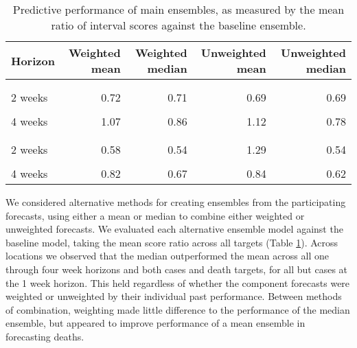 \documentclass[
]{article}
\begin{document}
\begin{table}

\caption{\label{tab:ensembles}Predictive performance of main ensembles, as measured by the mean ratio of interval scores against the baseline ensemble.}
\centering
\begin{tabular}[t]{lrrrr}
\toprule
Horizon & Weighted mean & Weighted median & Unweighted mean & Unweighted median\\
\midrule
\addlinespace[0.3em]
\multicolumn{5}{l}{\textbf{Cases}}\\
\hspace{1em}\cellcolor{gray!6}{1 week} & \cellcolor{gray!6}{0.63} & \cellcolor{gray!6}{0.64} & \cellcolor{gray!6}{0.61} & \cellcolor{gray!6}{0.64}\\
\hspace{1em}2 weeks & 0.72 & 0.71 & 0.69 & 0.69\\
\hspace{1em}\cellcolor{gray!6}{3 weeks} & \cellcolor{gray!6}{0.82} & \cellcolor{gray!6}{0.76} & \cellcolor{gray!6}{0.82} & \cellcolor{gray!6}{0.72}\\
\hspace{1em}4 weeks & 1.07 & 0.86 & 1.12 & 0.78\\
\addlinespace[0.3em]
\multicolumn{5}{l}{\textbf{Deaths}}\\
\hspace{1em}\cellcolor{gray!6}{1 week} & \cellcolor{gray!6}{0.65} & \cellcolor{gray!6}{0.61} & \cellcolor{gray!6}{1.81} & \cellcolor{gray!6}{0.61}\\
\hspace{1em}2 weeks & 0.58 & 0.54 & 1.29 & 0.54\\
\hspace{1em}\cellcolor{gray!6}{3 weeks} & \cellcolor{gray!6}{0.64} & \cellcolor{gray!6}{0.57} & \cellcolor{gray!6}{1.17} & \cellcolor{gray!6}{0.53}\\
\hspace{1em}4 weeks & 0.82 & 0.67 & 0.84 & 0.62\\
\bottomrule
\end{tabular}
\end{table}

We considered alternative methods for creating ensembles from the participating forecasts, using either a mean or median to combine either weighted or unweighted forecasts. We evaluated each alternative ensemble model against the baseline model, taking the mean score ratio across all targets (Table \ref{tab:ensembles}). Across locations we observed that the median outperformed the mean across all one through four week horizons and both cases and death targets, for all but cases at the 1 week horizon. This held regardless of whether the component forecasts were weighted or unweighted by their individual past performance. Between methods of combination, weighting made little difference to the performance of the median ensemble, but appeared to improve performance of a mean ensemble in forecasting deaths.
\end{document}
